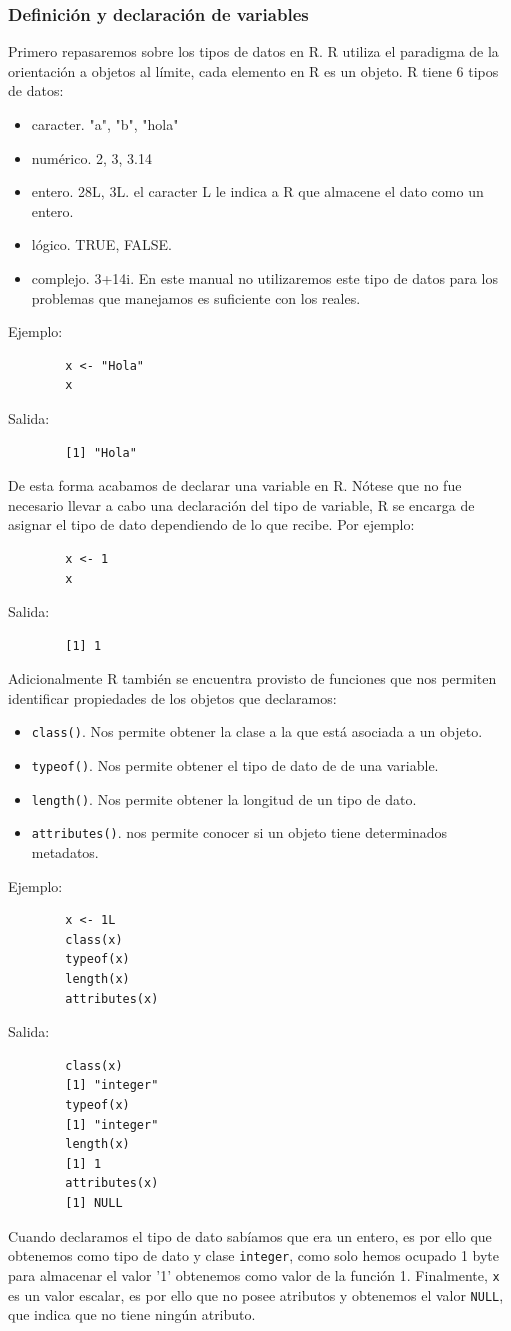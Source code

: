 \documentclass[12pt,hidelinks]{article}
\begin{document}
	\subsubsection{Definición y declaración de variables}
	Primero repasaremos sobre los tipos de datos en R. R utiliza el paradigma de la orientación a objetos al límite, cada elemento en R es un objeto. R tiene $6$ tipos de datos:
	\begin{itemize}
		\item caracter. "a", "b", "hola"
		\item numérico. 2, 3, 3.14
		\item entero. 28L, 3L. el caracter L le indica a R que almacene el dato como un entero.
		\item lógico. TRUE, FALSE.
		\item complejo. 3+14i. En este manual no utilizaremos este tipo de datos para los problemas que manejamos es suficiente con los reales.
	\end{itemize}
	Ejemplo:
	\begin{verbatim}
		x <- "Hola"
		x
	\end{verbatim}
	Salida:
	\begin{verbatim}
		[1] "Hola"
	\end{verbatim}
	De esta forma acabamos de declarar una variable en R. Nótese que no fue necesario llevar a cabo una declaración del tipo de variable, R se encarga de asignar el tipo de dato dependiendo de lo que recibe. Por ejemplo:
	\begin{verbatim}
		x <- 1
		x
	\end{verbatim}
	Salida:
	\begin{verbatim}
		[1] 1
	\end{verbatim}
	
	Adicionalmente R también se encuentra provisto de funciones que nos permiten identificar propiedades de los objetos que declaramos:
	\begin{itemize}
		\item \texttt{class()}. Nos permite obtener la clase a la que está asociada a un objeto.
		\item \texttt{typeof()}. Nos permite obtener el tipo de dato de de una variable.
		\item \texttt{length()}. Nos permite obtener la longitud de un tipo de dato.
		\item \texttt{attributes()}. nos permite conocer si un objeto tiene determinados metadatos.
	\end{itemize}
	Ejemplo:
	\begin{verbatim}
		x <- 1L
		class(x)
		typeof(x)
		length(x)
		attributes(x)
	\end{verbatim}
	Salida:
	\begin{verbatim}
		class(x)
		[1] "integer"
		typeof(x)
		[1] "integer"
		length(x)
		[1] 1
		attributes(x)
		[1] NULL
	\end{verbatim}
	Cuando declaramos el tipo de dato sabíamos que era un entero, es por ello que obtenemos como tipo de dato y clase \texttt{integer}, como solo hemos ocupado 1 byte para almacenar el valor '1' obtenemos como valor de la función 1. Finalmente, \texttt{x} es un valor escalar, es por ello que no posee atributos y obtenemos el valor \texttt{NULL}, que indica que no tiene ningún atributo.
\end{document}
